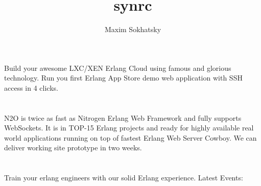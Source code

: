\documentclass[11pt]{article}
\begin{document}

\title{synrc}
\author{Maxim Sokhatsky}



\section*{}
\paragraph{}
Build your awesome LXC/XEN Erlang Cloud using famous  and glorious  technology.
Run you first Erlang App Store demo web application with SSH access in 4 clicks.

\section*{}
\paragraph{}
N2O is twice as fast as Nitrogen Erlang Web Framework and fully supports WebSockets.
It is in TOP-15 Erlang projects and ready for highly available real world applications running on top of fastest Erlang Web Server Cowboy.
We can deliver working site prototype in two weeks.

\section*{}
\paragraph{}
Train your erlang engineers with our solid Erlang experience.
Latest Events:
\paragraph{}
\end{document}
